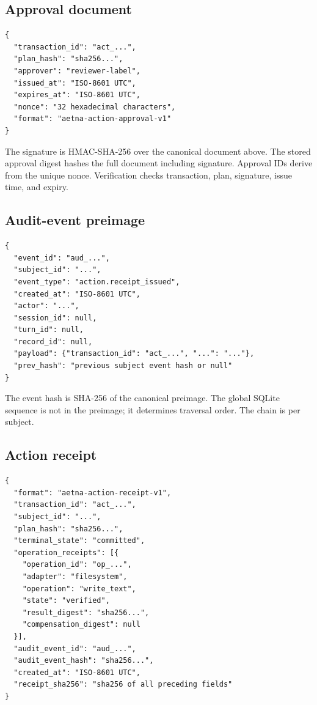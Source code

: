 \subsection{Approval document}

\begin{lstlisting}
{
  "transaction_id": "act_...",
  "plan_hash": "sha256...",
  "approver": "reviewer-label",
  "issued_at": "ISO-8601 UTC",
  "expires_at": "ISO-8601 UTC",
  "nonce": "32 hexadecimal characters",
  "format": "aetna-action-approval-v1"
}
\end{lstlisting}

The signature is HMAC-SHA-256 over the canonical document above. The stored approval digest hashes the full document including signature. Approval IDs derive from the unique nonce. Verification checks transaction, plan, signature, issue time, and expiry.

\subsection{Audit-event preimage}

\begin{lstlisting}
{
  "event_id": "aud_...",
  "subject_id": "...",
  "event_type": "action.receipt_issued",
  "created_at": "ISO-8601 UTC",
  "actor": "...",
  "session_id": null,
  "turn_id": null,
  "record_id": null,
  "payload": {"transaction_id": "act_...", "...": "..."},
  "prev_hash": "previous subject event hash or null"
}
\end{lstlisting}

The event hash is SHA-256 of the canonical preimage. The global SQLite sequence is not in the preimage; it determines traversal order. The chain is per subject.

\subsection{Action receipt}

\begin{lstlisting}
{
  "format": "aetna-action-receipt-v1",
  "transaction_id": "act_...",
  "subject_id": "...",
  "plan_hash": "sha256...",
  "terminal_state": "committed",
  "operation_receipts": [{
    "operation_id": "op_...",
    "adapter": "filesystem",
    "operation": "write_text",
    "state": "verified",
    "result_digest": "sha256...",
    "compensation_digest": null
  }],
  "audit_event_id": "aud_...",
  "audit_event_hash": "sha256...",
  "created_at": "ISO-8601 UTC",
  "receipt_sha256": "sha256 of all preceding fields"
}
\end{lstlisting}

